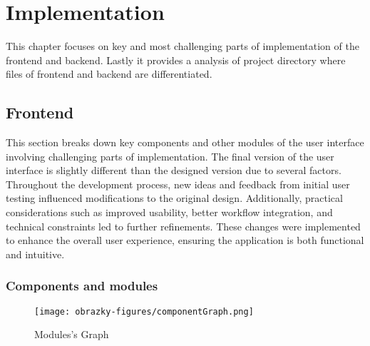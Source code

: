 \chapter{Implementation}

This chapter focuses on key and most challenging parts of implementation of the frontend and backend. Lastly it provides a analysis of project directory where files of frontend and backend are differentiated.

\section{Frontend}
\label{implementation:ui}

This section breaks down key components and other modules of the user interface involving challenging parts of implementation. The final version of the user interface is slightly different than the designed version due to several factors. Throughout the development process, new ideas and feedback from initial user testing influenced modifications to the original design. Additionally, practical considerations such as improved usability, better workflow integration, and technical constraints led to further refinements. These changes were implemented to enhance the overall user experience, ensuring the application is both functional and intuitive.

\subsection{Components and modules}

\begin{figure}[ht]
\centering
\texttt{[image: obrazky-figures/componentGraph.png]}
\caption{Modules's Graph}
\label{fig:implementation:componentsGraph}
\end{figure}

